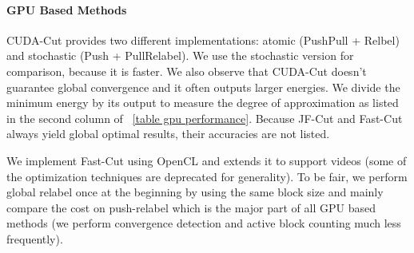 \paragraph*{\textbf{GPU Based Methods}}

CUDA-Cut provides two different implementations: atomic (PushPull + Relbel) and stochastic (Push + PullRelabel).
We use the stochastic version for comparison, because it is faster.
We also observe that CUDA-Cut doesn't guarantee global convergence and it often outputs larger energies.
We divide the minimum energy by its output to measure the degree of approximation as listed in the second column of \tablename \ \ref{table gpu performance}.
Because JF-Cut and Fast-Cut always yield global optimal results, their accuracies are not listed.

We implement Fast-Cut using OpenCL and extends it to support videos (some of the optimization techniques are deprecated for generality).
To be fair, we perform global relabel once at the beginning by using the same block size and mainly compare the cost on push-relabel which is the major part of all GPU based methods
(we perform convergence detection and active block counting much less frequently).

